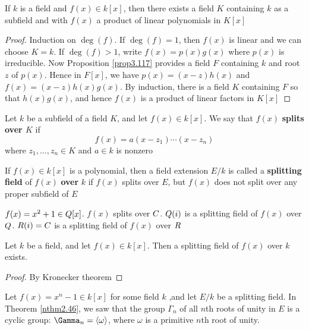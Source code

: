 \documentclass[11pt]{article}
\begin{document}
\begin{theorem}[Kronecker]
If \(k\) is a field and \(f(x)\in k[x]\), then there exists a field \(K\)
containing \(k\) as a subfield and with \(f(x)\) a product of linear
polynomials in \(K[x]\)
\end{theorem}

\begin{proof}
Induction on \(\deg(f)\). If \(\deg(f)=1\), then \(f(x)\) is linear and we can
choose \(K=k\). If \(\deg(f)>1\), write \(f(x)=p(x)g(x)\) where \(p(x)\) is
irreducible. Now Proposition \ref{prop3.117} provides a field \(F\) containing
\(k\) and root \(z\) of \(p(x)\). Hence in \(F[x]\), we have \(p(x)=(x-z)h(x)\)
and \(f(x)=(x-z)h(x)g(x)\). By induction, there is a field \(K\) containing \(F\)
so that \(h(x)g(x)\), and hence \(f(x)\) is a product of linear factors in \(K[x]\)
\end{proof}

\begin{definition}[]
Let \(k\) be a subfield of a field \(K\), and let \(f(x)\in k[x]\). We say that
\(f(x)\) \textbf{splits over \(K\)} if
\begin{equation*}
f(x)=a(x-z_1)\cdots(x-z_n)
\end{equation*}
where \(z_1,\dots,z_n\in K\) and \(a\in k\) is nonzero

If \(f(x)\in k[x]\) is a polynomial, then a field extension \(E/k\) is called
a \textbf{splitting field} of \(f(x)\) \textbf{over} \(k\) if \(f(x)\) splits over \(E\), but
\(f(x)\) does not split over any proper subfield of \(E\)
\end{definition}

\(f(x)=x^2+1\in\relax{Q}[x]\). \(f(x)\) splits over \(\relax{C}\). \(\relax{Q}(i)\) is a splitting
field of \(f(x)\) over \(\relax{Q}\). \(\relax{R}(i)=\relax{C}\) is a splitting field of \(f(x)\)
over \(\relax{R}\) 


\begin{corollary}[]
Let \(k\) be a field, and let \(f(x)\in k[x]\). Then a splitting field of
\(f(x)\) over \(k\) exists.
\end{corollary}

\begin{proof}
By Kronecker theorem
\end{proof}

\begin{examplle}[]
\label{nexample2.151}
Let \(f(x)=x^n-1\in k[x]\) for some field \(k\) ,and let \(E/k\) be a splitting
field. In Theorem \ref{nthm2.46}, we saw that the group \(\Gamma_n\) of all
\(n\)th roots of unity in \(E\) is a cyclic group: \(\Gamma_n=\la\omega\ra\),
where \(\omega\) is a primitive \(n\)th root of unity.
\end{examplle}
\end{document}
